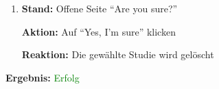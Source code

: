 \documentclass[a4paper]{scrreprt}
\begin{document}
\begin{itemize}
\begin{enumerate}
		      						\item \par \textbf{Stand: }Offene Seite ``Are you sure?''
		                                    \par \textbf{Aktion: }Auf ``Yes, I'm sure'' klicken
		                                    \par \textbf{Reaktion: }Die gew\"ahlte Studie wird gel\"oscht                                                                                                  
		                          \end{enumerate}
		      					\vspace*{0.3cm}
		      		           \par \textbf{Ergebnis: }\textcolor{green}{Erfolg}
		      		           \vspace*{0.6cm}  
		      		           

\end{itemize}
\end{document}
